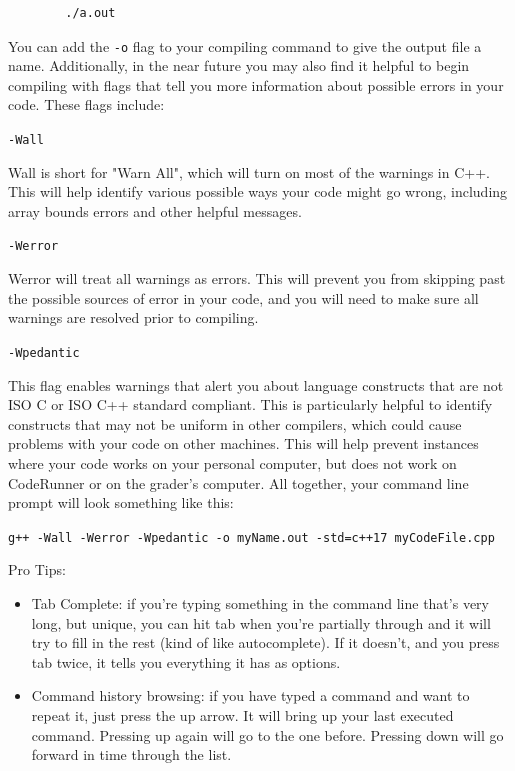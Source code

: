 \begin{verbatim}
        ./a.out
\end{verbatim}

You can add the \texttt{-o} flag to your compiling command to give the output file a name. Additionally, in the near future you may also find it helpful to begin compiling with flags that tell you more information about possible errors in your code. These flags include:

\texttt{-Wall}

Wall is short for "Warn All", which will turn on most of the warnings in C++. This will help identify various possible ways your code might go wrong, including array bounds errors and other helpful messages.

\texttt{-Werror}

Werror will treat all warnings as errors. This will prevent you from skipping past the possible sources of error in your code, and you will need to make sure all warnings are resolved prior to compiling.

\texttt{-Wpedantic}

This flag enables warnings that alert you about language constructs that are not ISO C or ISO C++ standard compliant. This is particularly helpful to identify constructs that may not be uniform in other compilers, which could cause problems with your code on other machines. This will help prevent instances where your code works on your personal computer, but does not work on CodeRunner or on the grader's computer. All together, your command line prompt will look something like this:

\texttt{g++ -Wall -Werror -Wpedantic -o myName.out -std=c++17 myCodeFile.cpp}

Pro Tips:
\begin{itemize}
    \item Tab Complete: if you're typing something in the command line that’s very long, but unique, you can hit tab when you're partially through and it will try to fill in the rest (kind of like autocomplete). If it doesn't, and you press tab twice, it tells you everything it has as options.
    \item Command history browsing: if you have typed a command and want to repeat it, just press the up arrow. It will bring up your last executed command. Pressing up again will go to the one before. Pressing down will go forward in time through the list.
\end{itemize}

